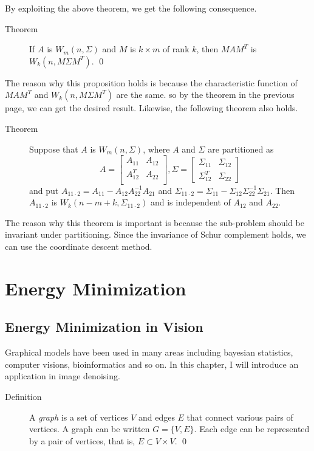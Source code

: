 \documentclass[openany]{memoir}
\begin{document}
By exploiting the above theorem, we get the following consequence.

\begin{description}
\item[Theorem] If $A$ is $W_m(n, \Sigma)$ and $M$ is $k \times m$ of rank $k$, then $MAM^T$ is $W_k(n, M\Sigma M^T)$. \qed
\end{description}

The reason why this proposition holds is because the characteristic function of $MAM^T$ and $W_k(n, M\Sigma M^T)$ are the same. so by the theorem in the previous page, we can get the desired result. Likewise, the following theorem also holds.

\begin{description}
\item[Theorem] Suppose that $A$ is $W_m(n, \Sigma)$, where $A$ and $\Sigma$ are partitioned as
$$A = \begin{bmatrix}
A_{11} & A_{12} \\
A_{12}^T & A_{22}\\
\end{bmatrix}, \Sigma = \begin{bmatrix}
\Sigma_{11} & \Sigma_{12} \\
\Sigma_{12}^{T} & \Sigma_{22}
\end{bmatrix}$$
and put $A_{11\cdot2}=A_{11} - A_{12}A_{22}^{-1}A_{21}$ and $\Sigma_{11\cdot2}=\Sigma_{11} - \Sigma_{12} \Sigma_{22}^{-1} \Sigma_{21}$. Then $A_{11\cdot2}$ is $W_k(n - m + k, \Sigma_{11\cdot2})$ and is independent of $A_{12}$ and $A_{22}$.
\end{description}

The reason why this theorem is important is because the sub-problem should be invariant under partitioning. Since the invariance of Schur complement holds, we can use the coordinate descent method.

\chapter{Energy Minimization}
\section{Energy Minimization in Vision}
Graphical models have been used in many areas including bayesian statistics, computer visions, bioinformatics and so on. In this chapter, I will introduce an application in image denoising. 
\begin{description}
\item[Definition] A \textit{graph} is a set of vertices $V$ and edges $E$ that connect various pairs of vertices. A graph can be written $G = \{V, E\}$. Each edge can be represented by a pair of vertices, that is, $E \subset V \times V$. \qed
\end{description}
\end{document}
